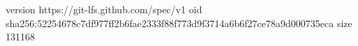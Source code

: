 version https://git-lfs.github.com/spec/v1
oid sha256:52254678c7df977ff2b6fae2333f88f773d9f3714a6b6f27ce78a9d000735eca
size 131168
